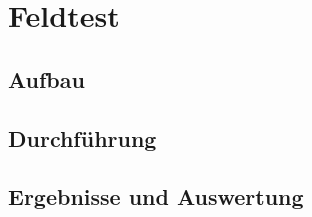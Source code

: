 \chapter{Feldtest}
\label{sec:Feldtest}
\pagestyle{scrheadings}
\section{Aufbau}
\section{Durchführung}
\section{Ergebnisse und Auswertung}